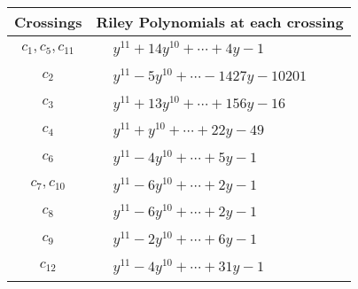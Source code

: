 \documentclass[1p]{elsarticle_modified}
\theoremstyle{definition}
\begin{document}
\begin{tabular}{m{50pt}|m{274pt}}
Crossings & \hspace{64pt}Riley Polynomials at each crossing \\
\hline $$\begin{aligned}c_{1},c_{5},c_{11}\end{aligned}$$&$\begin{aligned}
&y^{11}+14 y^{10}+\cdots+4 y-1
\end{aligned}$\\
\hline $$\begin{aligned}c_{2}\end{aligned}$$&$\begin{aligned}
&y^{11}-5 y^{10}+\cdots-1427 y-10201
\end{aligned}$\\
\hline $$\begin{aligned}c_{3}\end{aligned}$$&$\begin{aligned}
&y^{11}+13 y^{10}+\cdots+156 y-16
\end{aligned}$\\
\hline $$\begin{aligned}c_{4}\end{aligned}$$&$\begin{aligned}
&y^{11}+y^{10}+\cdots+22 y-49
\end{aligned}$\\
\hline $$\begin{aligned}c_{6}\end{aligned}$$&$\begin{aligned}
&y^{11}-4 y^{10}+\cdots+5 y-1
\end{aligned}$\\
\hline $$\begin{aligned}c_{7},c_{10}\end{aligned}$$&$\begin{aligned}
&y^{11}-6 y^{10}+\cdots+2 y-1
\end{aligned}$\\
\hline $$\begin{aligned}c_{8}\end{aligned}$$&$\begin{aligned}
&y^{11}-6 y^{10}+\cdots+2 y-1
\end{aligned}$\\
\hline $$\begin{aligned}c_{9}\end{aligned}$$&$\begin{aligned}
&y^{11}-2 y^{10}+\cdots+6 y-1
\end{aligned}$\\
\hline $$\begin{aligned}c_{12}\end{aligned}$$&$\begin{aligned}
&y^{11}-4 y^{10}+\cdots+31 y-1
\end{aligned}$\\
\hline
\end{tabular}\\~\\
\end{document}
